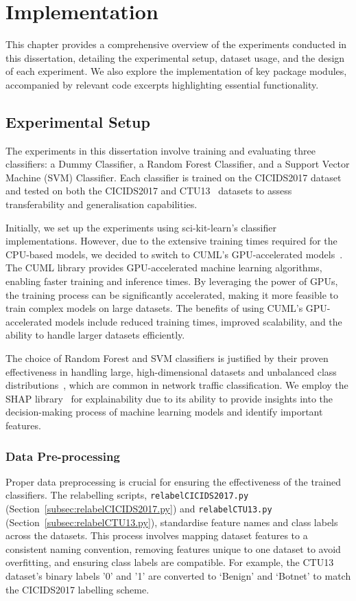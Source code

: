 \chapter{Implementation}
This chapter provides a comprehensive overview of the experiments conducted in this dissertation, detailing the experimental setup, dataset usage, and the design of each experiment. We also explore the implementation of key package modules, accompanied by relevant code excerpts highlighting essential functionality.

\section{Experimental Setup}\label{sec:experimental-setup}
The experiments in this dissertation involve training and evaluating three classifiers: a Dummy Classifier, a Random Forest Classifier, and a Support Vector Machine (SVM) Classifier. Each classifier is trained on the CICIDS2017 dataset~\cite{sharafaldin2018toward} and tested on both the CICIDS2017 and CTU13~\cite{garcia2014empirical} datasets to assess transferability and generalisation capabilities.

Initially, we set up the experiments using sci-kit-learn's classifier implementations. However, due to the extensive training times required for the CPU-based models, we decided to switch to CUML's GPU-accelerated models~\cite{raschka2020machine}. The CUML library provides GPU-accelerated machine learning algorithms, enabling faster training and inference times. By leveraging the power of GPUs, the training process can be significantly accelerated, making it more feasible to train complex models on large datasets. The benefits of using CUML's GPU-accelerated models include reduced training times, improved scalability, and the ability to handle larger datasets efficiently.

The choice of Random Forest and SVM classifiers is justified by their proven effectiveness in handling large, high-dimensional datasets and unbalanced class distributions~\cite{farnaaz2016random, teng2017svm}, which are common in network traffic classification. We employ the SHAP library~\cite{lundberg2017unified} for explainability due to its ability to provide insights into the decision-making process of machine learning models and identify important features.

\subsection{Data Pre-processing}\label{subsec:pre-processing}
Proper data preprocessing is crucial for ensuring the effectiveness of the trained classifiers. The relabelling scripts, \texttt{relabelCICIDS2017.py} (Section~\ref{subsec:relabelCICIDS2017.py}) and \texttt{relabelCTU13.py} (Section~\ref{subsec:relabelCTU13.py}), standardise feature names and class labels across the datasets. This process involves mapping dataset features to a consistent naming convention, removing features unique to one dataset to avoid overfitting, and ensuring class labels are compatible. For example, the CTU13 dataset's binary labels '0' and '1' are converted to `Benign' and `Botnet' to match the CICIDS2017 labelling scheme.

